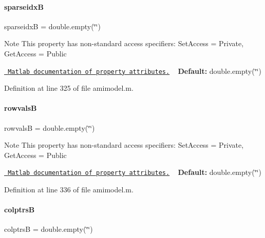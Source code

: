 \paragraph{\texorpdfstring{sparseidxB}{sparseidxB}}
{\footnotesize\ttfamily sparseidxB = double.\+empty(\char`\"{}\char`\"{})}

\begin{DoxyNote}{Note}
This property has non-\/standard access specifiers\+: {\ttfamily Set\+Access = Private, Get\+Access = Public} 

\href{http://www.mathworks.com/help/matlab/matlab_oop/property-attributes.html}{\texttt{ Matlab documentation of property attributes.}} ~\newline
{\bfseries{Default\+:}} double.\+empty(\char`\"{}\char`\"{}) 
\end{DoxyNote}


Definition at line 325 of file amimodel.\+m.

\mbox{\label{classamimodel_a1ba81ee0e28fe7c7576911973c82be70}} 
\paragraph{\texorpdfstring{rowvalsB}{rowvalsB}}
{\footnotesize\ttfamily rowvalsB = double.\+empty(\char`\"{}\char`\"{})}

\begin{DoxyNote}{Note}
This property has non-\/standard access specifiers\+: {\ttfamily Set\+Access = Private, Get\+Access = Public} 

\href{http://www.mathworks.com/help/matlab/matlab_oop/property-attributes.html}{\texttt{ Matlab documentation of property attributes.}} ~\newline
{\bfseries{Default\+:}} double.\+empty(\char`\"{}\char`\"{}) 
\end{DoxyNote}


Definition at line 336 of file amimodel.\+m.

\mbox{\label{classamimodel_a3a4891c5565b544dd7d4362dbbfaadf7}} 
\paragraph{\texorpdfstring{colptrsB}{colptrsB}}
{\footnotesize\ttfamily colptrsB = double.\+empty(\char`\"{}\char`\"{})}

